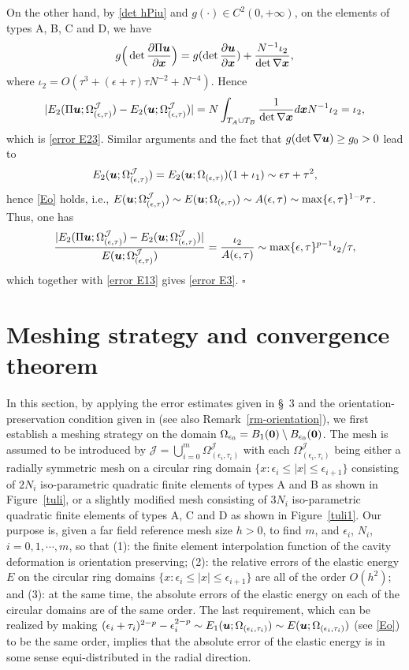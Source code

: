 \documentclass[12pt]{article}
\renewcommand{\vec}[1]{\mbox{\boldmath$#1$}}
\numberwithin{equation}{section}
\begin{document}
On the other hand, by \eqref{det hPiu} and
$g(\cdot) \in C^2(0,+\infty)$, on the elements of types A, B, C and D, we have
$$
g\Big(\det \frac{\partial \Pi \vec{u}}{\partial \vec{x}}\Big)=
g(\det \frac{\partial \vec{u}}{\partial \vec{x}})+\frac{N^{-1}\iota_2}{
\det \nabla \vec{x}},$$
where $\iota_2=O(\tau^3+(\epsilon+\tau)\tau N^{-2} +N^{-4})$.
Hence
$$
|E_2(\Pi \vec{u};\Omega^{\mathcal{J}}_{(\epsilon,\tau)})-
E_2(\vec{u};\Omega^{\mathcal{J}}_{(\epsilon,\tau)})|=
N\int_{T_A\cup T_B}\frac{1}{\det \nabla \vec{x}}d\vec{x}N^{-1}\iota_2
=\iota_2,
$$
which is \eqref{error E23}. Similar arguments and the fact that $g(\det \nabla \vec{u})
\ge g_0>0$ lead to
$$
E_2(\vec{u};\Omega^{\mathcal{J}}_{(\epsilon,\tau)})=
E_2(\vec{u};\Omega_{(\epsilon,\tau)})(1+\iota_1)\sim \epsilon\tau+\tau^2,
$$
hence \eqref{Eo} holds, i.e., $E(\vec{u};\Omega^{\mathcal{J}}_{(\epsilon,\tau)})
\sim E(\vec{u};\Omega_{(\epsilon,\tau)})\sim A(\epsilon,\tau)
\sim \max\{\epsilon,\tau\}^{1-p}\tau$.
Thus, one has
$$
\frac{|E_2(\Pi \vec{u};\Omega^{\mathcal{J}}_{(\epsilon,\tau)})-E_2(\vec{u};
\Omega^{\mathcal{J}}_{(\epsilon,\tau)})|}{
E(\vec{u};\Omega^{\mathcal{J}}_{(\epsilon,\tau)})}=\frac{\iota_2}{A(\epsilon,\tau)}
\sim \max\{\epsilon,\tau\}^{p-1}\iota_2/\tau,
$$
which together with \eqref{error E13} gives \eqref{error E3}.
\hfill $\square$


\section{Meshing strategy and convergence theorem}

In this section, by applying the error estimates given in \S~3 and the
orientation-preservation condition given in \cite{detp} (see also
Remark~\ref{rm-orientation}), we first establish a meshing
strategy on the domain $\Omega_{\epsilon_0}=B_1(\vec{0})\setminus B_{\epsilon_0}(\vec{0})$.
The mesh is assumed to be introduced by $\mathcal{J}=\bigcup \limits_{i=0}^{m}
\Omega^{\mathcal{J}}_{(\epsilon_i,\tau_i)}$ with each $\Omega^{\mathcal{J}}_{(\epsilon_i,\tau_i)}$ being either a radially symmetric
mesh on a circular ring domain $\{x : \epsilon_i \leq |x| \leq \epsilon_{i+1}\}$
consisting of $2N_i$ iso-parametric quadratic finite elements of types A and B
as shown in Figure~\ref{tuli}, or a slightly modified mesh consisting of $3N_i$
iso-parametric quadratic finite elements of types A, C and D as shown in
Figure~\ref{tuli1}. Our purpose is,
given a far field reference mesh size $h>0$, to find $m$, and $\epsilon_i$,
$N_i$, $i=0,1,\cdots, m$, so that (1): the finite element interpolation function of the
cavity deformation is orientation preserving; (2): the relative errors of the
elastic energy $E$ on the circular ring domains
$\{x : \epsilon_i \leq |x| \leq \epsilon_{i+1}\}$ are all of the
order $O(h^{2})$; and (3): at the same time, the absolute errors of the elastic
energy on each of the circular domains are of the same order. The last
requirement, which can be realized by making $(\epsilon_i + \tau_i)^{2-p}-
\epsilon_i^{2-p} \sim E_1(\vec{u};\Omega_{(\epsilon_i,\tau_i)}) \sim
E(\vec{u};\Omega_{(\epsilon_i,\tau_i)})$ (see \eqref{Eo})
to be the same order, implies that the absolute error of the
elastic energy is in some sense equi-distributed in the radial direction.
\end{document}
